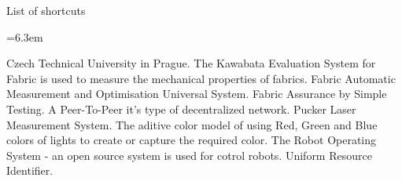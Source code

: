 \app List of shortcuts

\medskip
\bgroup \leftskip=6.3em

\abbrv[CTU]  Czech Technical University in Prague.
\abbrv[KESF]  The Kawabata Evaluation System for Fabric is used to measure the mechanical properties of fabrics.
\abbrv[FAMOUS]  Fabric Automatic Measurement and Optimisation Universal System.
\abbrv[FAST]  Fabric Assurance by Simple Testing.
\abbrv[P2P]  A Peer-To-Peer it's type of decentralized network. 
\abbrv[PLMS]  Pucker Laser Measurement System.
\abbrv[RGB]  The aditive color model of using Red, Green and Blue colors of lights to create or capture the required color.
\abbrv[ROS]  The Robot Operating System - an open source system is used for cotrol robots.  
\abbrv[URI]  Uniform Resource Identifier.

\par\egroup
